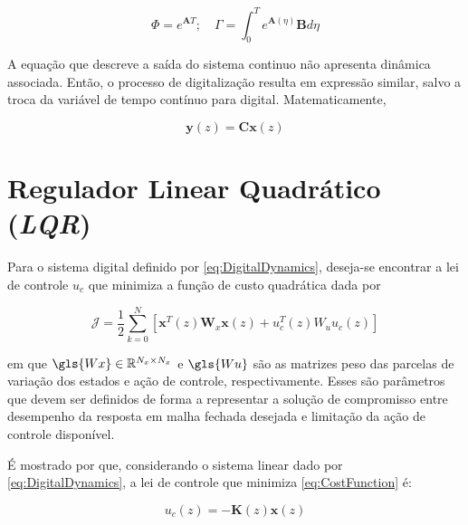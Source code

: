 \begin{equation}\label{eq:cap3sec1:DigitalDynamicsMatrices}
    \Phi = e^{\boldsymbol{A}T}; \quad \Gamma = \int_{0}^{T}  e^{\boldsymbol{A}(\eta)}\boldsymbol{B} d\eta
\end{equation}

A equação que descreve a saída do sistema continuo não apresenta dinâmica associada. Então, o processo de digitalização resulta em expressão similar, salvo a troca da variável de tempo contínuo para digital. Matematicamente, 

\begin{equation}\label{Eq_EspaçoEstados_Discreto_Saida}
    \boldsymbol{y}(z) = \boldsymbol{C}\boldsymbol{x}(z)
\end{equation}


\section{Regulador Linear Quadrático  (\textit{LQR})}\label{sec:lqr}

Para o sistema digital definido por \eqref{eq:DigitalDynamics}, deseja-se encontrar a lei de controle $u_{c}$ que minimiza a função de custo quadrática dada por

\begin{equation}\label{eq:CostFunction}
    \mathcal{J} = \frac{1}{2} \sum_{k=0}^{N} \left[ \boldsymbol{x}^{T}(z)\boldsymbol{W}_{x}\boldsymbol{x}(z) + u_{c}^{T}(z)W_{u}u_{c}(z)  \right]
\end{equation}

\noindent em que $\gls{Wx} \in \mathbb{R}^{N_{x} \times N_{x}}$ e $\gls{Wu}$ são as matrizes peso das parcelas de variação dos estados e ação de controle, respectivamente. Esses são parâmetros que devem ser definidos de forma a representar a solução de compromisso entre desempenho da resposta em malha fechada desejada e limitação da ação de controle disponível.

É mostrado por \textcite{book:Franklin} que, considerando o sistema linear dado por \eqref{eq:DigitalDynamics}, a lei de controle que minimiza \eqref{eq:CostFunction} é:

\begin{equation}\label{eq:cap3sec2:ControlLaw}
    u_{c}(z) = -\boldsymbol{K}(z)\boldsymbol{x}(z)
\end{equation}

